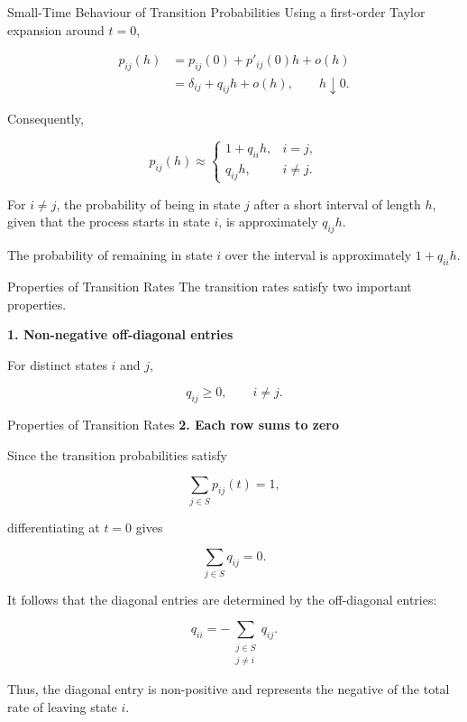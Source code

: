 \documentclass[
  ignorenonframetext,
  aspectratio=169,
]{beamer}
\begin{document}
\begin{frame}{Small-Time Behaviour of Transition Probabilities}
\protect{}\label{small-time-behaviour-of-transition-probabilities}
Using a first-order Taylor expansion around \(t=0\),

\[
\begin{aligned}
p_{ij}(h)
&=p_{ij}(0)+p'_{ij}(0)h+o(h)\\
&=\delta_{ij}+q_{ij}h+o(h),
\qquad h\downarrow 0.
\end{aligned}
\]

Consequently,

\[
\boxed{
p_{ij}(h)\approx
\begin{cases}
1+q_{ii}h, & i=j,\\
q_{ij}h, & i\neq j.
\end{cases}
}
\]

For \(i\neq j\), the probability of being in state \(j\) after a short
interval of length \(h\), given that the process starts in state \(i\),
is approximately \(q_{ij}h\).

The probability of remaining in state \(i\) over the interval is
approximately \(1+q_{ii}h\).
\end{frame}

\begin{frame}{Properties of Transition Rates}
\protect{}\label{properties-of-transition-rates}
The transition rates satisfy two important properties.

\textbf{1. Non-negative off-diagonal entries}

For distinct states \(i\) and \(j\),

\[
\boxed{
q_{ij}\geq 0,\qquad i\neq j.
}
\]
\end{frame}

\begin{frame}{Properties of Transition Rates}
\protect{}\label{properties-of-transition-rates-1}
\textbf{2. Each row sums to zero}

Since the transition probabilities satisfy

\[
\sum_{j\in S}p_{ij}(t)=1,
\]

differentiating at \(t=0\) gives

\[
\boxed{
\sum_{j\in S}q_{ij}=0.
}
\]

It follows that the diagonal entries are determined by the off-diagonal
entries:

\[
\boxed{
q_{ii}=-\sum_{\substack{j\in S\\j\neq i}}q_{ij}.
}
\]

Thus, the diagonal entry is non-positive and represents the negative of
the total rate of leaving state \(i\).
\end{frame}
\end{document}
